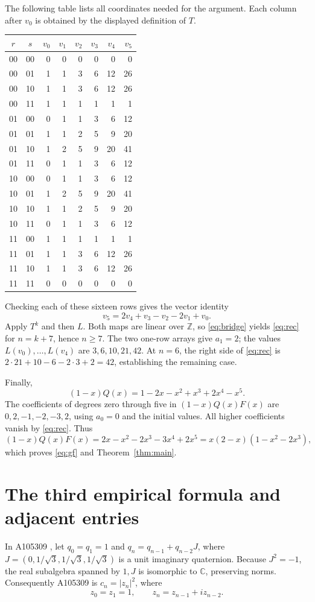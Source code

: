 \documentclass[11pt]{article}
\newcommand{\Z}{\mathbb{Z}}
\begin{document}
The following table lists all coordinates needed for the argument.
Each column after $v_0$ is obtained by the displayed definition of $T$.
\begin{center}
\small
\begin{tabular}{ccrrrrrr}
\toprule
$r$&$s$&$v_0$&$v_1$&$v_2$&$v_3$&$v_4$&$v_5$\\
\midrule
00&00&0&0&0&0&0&0\\
00&01&1&1&3&6&12&26\\
00&10&1&1&3&6&12&26\\
00&11&1&1&1&1&1&1\\
01&00&0&1&1&3&6&12\\
01&01&1&1&2&5&9&20\\
01&10&1&2&5&9&20&41\\
01&11&0&1&1&3&6&12\\
10&00&0&1&1&3&6&12\\
10&01&1&2&5&9&20&41\\
10&10&1&1&2&5&9&20\\
10&11&0&1&1&3&6&12\\
11&00&1&1&1&1&1&1\\
11&01&1&1&3&6&12&26\\
11&10&1&1&3&6&12&26\\
11&11&0&0&0&0&0&0\\
\bottomrule
\end{tabular}
\end{center}
Checking each of these sixteen rows gives the vector identity
\begin{equation}\label{eq:certificate}
 v_5=2v_4+v_3-v_2-2v_1+v_0.
\end{equation}
Apply $T^k$ and then $L$. Both maps are linear over $\Z$, so
\eqref{eq:bridge} yields \eqref{eq:rec} for $n=k+7$, hence $n\geq7$.
The two one-row arrays give $a_1=2$; the values
$L(v_0),\ldots,L(v_4)$ are $3,6,10,21,42$.
At $n=6$, the right side of \eqref{eq:rec} is
$2\cdot21+10-6-2\cdot3+2=42$, establishing the remaining case.

Finally,
\[
 (1-x)Q(x)=1-2x-x^2+x^3+2x^4-x^5.
\]
The coefficients of degrees zero through five in $(1-x)Q(x)F(x)$
are $0,2,-1,-2,-3,2$, using $a_0=0$ and the initial values.
All higher coefficients vanish by \eqref{eq:rec}. Thus
\[
 (1-x)Q(x)F(x)=2x-x^2-2x^3-3x^4+2x^5
             =x(2-x)(1-x^2-2x^3),
\]
which proves \eqref{eq:gf} and Theorem~\ref{thm:main}.

\section{The third empirical formula and adjacent entries}
In A105309 \cite{norm}, let $q_0=q_1=1$ and
$q_n=q_{n-1}+q_{n-2}J$, where
$J=(0,1/\sqrt3,1/\sqrt3,1/\sqrt3)$ is a unit imaginary quaternion.
Because $J^2=-1$, the real subalgebra spanned by $1,J$ is isomorphic
to $\mathbb C$, preserving norms. Consequently A105309 is
$c_n=|z_n|^2$, where
\[
 z_0=z_1=1,\qquad z_n=z_{n-1}+i z_{n-2}.
\]
\end{document}
